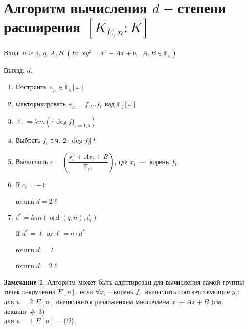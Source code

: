 \documentclass[12pt]{article}
\newcommand{\F}{{{\mathbb F}}}
\newcommand{\bigO}{\mathcal{O}}
\theoremstyle{definition}
\theoremstyle{definition}
\theoremstyle{definition}
\newtheorem{remark}[theorem]{Замечание}
\begin{document}
\section*{Алгоритм вычисления $d$ -- степени расширения $[{K_{E,n}}:K]$}

Вход: $n \geqslant 3$, $q$, $A, B$ $( E:\:x{y^2} = {x^3} + Ax + b,\;\;A,B \in \F_q )$

Выход: $d$. 

\begin{enumerate}
	\item Построить ${\psi _n} \in {\F_q}[x]$
	
	\item Факторизировать ${\psi _n} = {f_1} \ldots {f_r}$ над ${\F_q}[x]$
	
	\item $\ell: = lcm( {{{\{ {\deg f}\}}_{i = 1,5}}} )$
	
	\item Выбрать ${f_i}$ т.ч. $2 \cdot \deg {f_i} \not | \; l$
	
	\item Вычислить $c = (\dfrac{x_i^3 + A{x_i} + B}{\F_{q^{d_i}}})$, где $x_i$~---~корень $f_i$.
	
	\item If $c_i = - 1$:
	
	\quad return $d = 2\ell$
	
	\item ${d^*} = lcm( {\operatorname{ord} ( {q,n}),{d_i}})$
	
	If ${d^*} = \ell$ or $\ell = n \cdot {d^*}$
	
	\quad return $d = \ell$
	
	return $d = 2\ell$ 
\end{enumerate}

\begin{remark}
	Алгоритм может быть адаптирован для вычисления самой группы точек $n$-кручения $E[ n]$, если $\forall {x_i}$ -- корень ${f_i}$, вычислить соответствующие ${y_i}$:\\
	для $n = 2, E[n]$ вычисляется разложением многочлена ${x^3} + Ax + B$ (см. лекцию~\#~3) \\
	для $n = 1, E[n] = \{ \bigO \}$. 
\end{remark}
\end{document}
